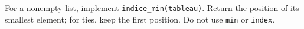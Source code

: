 For a nonempty list, implement \texttt{indice\_min(tableau)}. Return the position of its smallest element; for ties, keep the first position. Do not use \texttt{min} or \texttt{index}.
